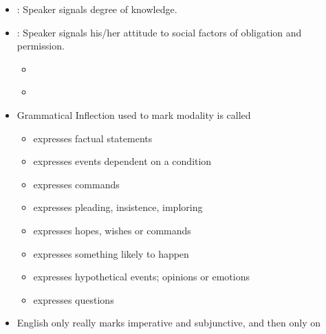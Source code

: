 \documentclass[headrule,footrule]{foils}
\begin{document}
\begin{itemize}
\item  {}: Speaker signals degree of  
knowledge.
\begin{exe}
  \ex {}
\end{exe}
\item  {}: Speaker signals his/her attitude  
to social factors of obligation and permission.
\begin{itemize}
\item {}
  \begin{exe}
    \ex {}
    \ex {}
  \end{exe}
\item {}
  \begin{exe}
    \ex {}
    \ex {}
  \end{exe}
\end{itemize}
\end{itemize}


\begin{itemize}
\item Grammatical Inflection used to mark modality is called 
  \begin{itemize}
  \item {} expresses factual statements
  \item {} expresses events dependent on a condition
  \item {} expresses commands
  \item {} expresses pleading, insistence, imploring
  \item {} expresses hopes, wishes or commands 
  \item {} expresses something likely to happen
  \item {} expresses  hypothetical events; opinions or emotions
  \item {} expresses questions
\end{itemize}
\item English only really marks imperative and subjunctive, and then only on 
  \begin{exe}
    \ex {}
    \ex {}
  \end{exe}
\end{itemize}
\end{document}
